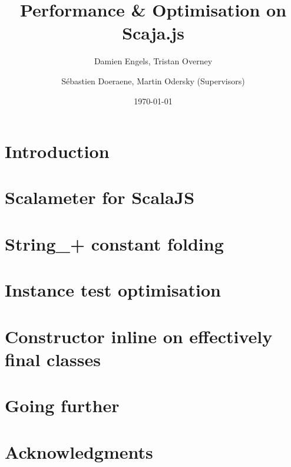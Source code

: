 \documentclass{article}
\begin{document}
\title{Performance \& Optimisation on Scaja.js}
\author{Damien Engels, Tristan Overney\and S\'{e}bastien Doeraene, Martin
Odersky (Supervisors)}
\date{\today}
\maketitle

\nocite{*}

\section{Introduction}


\section{Scalameter for ScalaJS}


\section{String\_+ constant folding}


\section{Instance test optimisation}


\section{Constructor inline on effectively final classes}


\section{Going further}


\section*{Acknowledgments}


{}

\end{document}
